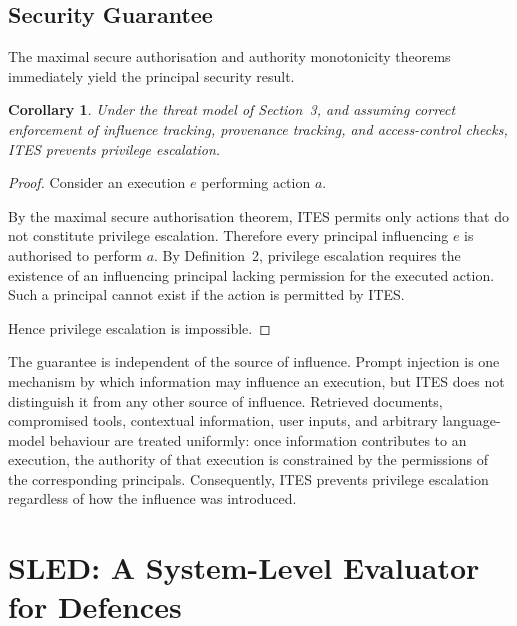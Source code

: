 \documentclass{article} %
\newtheorem{corollary}{Corollary}
\begin{document}
\subsection{Security Guarantee}

The maximal secure authorisation and authority monotonicity theorems immediately yield the principal security result.

\begin{corollary}
Under the threat model of Section~3, and assuming correct enforcement of influence tracking, provenance tracking, and access-control checks, ITES prevents privilege escalation.
\end{corollary}

\begin{proof}
Consider an execution \(e\) performing action \(a\).

By the maximal secure authorisation theorem, ITES permits only actions that do not constitute privilege escalation. Therefore every principal influencing \(e\) is authorised to perform \(a\). By Definition~2, privilege escalation requires the existence of an influencing principal lacking permission for the executed action. Such a principal cannot exist if the action is permitted by ITES.

Hence privilege escalation is impossible.
\end{proof}

The guarantee is independent of the source of influence. Prompt injection is one mechanism by which information may influence an execution, but ITES does not distinguish it from any other source of influence. Retrieved documents, compromised tools, contextual information, user inputs, and arbitrary language-model behaviour are treated uniformly: once information contributes to an execution, the authority of that execution is constrained by the permissions of the corresponding principals. Consequently, ITES prevents privilege escalation regardless of how the influence was introduced.














\section{SLED: A System-Level Evaluator for Defences}

%  
\end{document}
